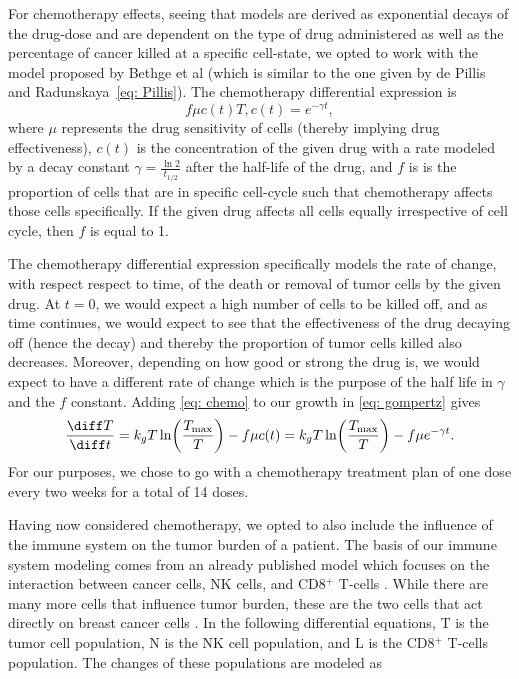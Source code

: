\documentclass[11pt]{amsart}
\begin{document}
For chemotherapy effects, seeing that models are derived as exponential decays of the drug-dose and are dependent on the type of drug administered as well as the percentage of cancer killed at a specific cell-state, we opted to work with the model proposed by Bethge et al (which is similar to the one given by de Pillis and Radunskaya\ \eqref{eq: Pillis}). The chemotherapy differential expression is
\begin{equation}
	f \mu c(t) T, c(t) = e^{-\gamma t} \label{eq: chemo},
\end{equation}
where $\mu$ represents the drug sensitivity of cells (thereby implying drug effectiveness), $c(t)$ is the concentration of the given drug with a rate modeled by a decay constant $\gamma=\frac{\ln{2}}{t_{1/2}}$ after the half-life of the drug, and $f$ is is the proportion of cells that are in specific cell-cycle such that chemotherapy affects those cells specifically.
If the given drug affects all cells equally irrespective of cell cycle, then $f$ is equal to 1.

The chemotherapy differential expression specifically models the rate of change, with respect respect to time, of the death or removal of tumor cells by the given drug.
At $t=0$, we would expect a high number of cells to be killed off, and as time continues, we would expect to see that the effectiveness of the drug decaying off (hence the decay) and thereby the proportion of tumor cells killed also decreases.
Moreover, depending on how good or strong the drug is, we would expect to have a different rate of change which is the purpose of the half life in $\gamma$ and the $f$ constant.
Adding \eqref{eq: chemo} to our growth in \eqref{eq: gompertz} gives 
\begin{equation}
	\frac{\diff T}{\diff t} = k_g T \ln \biggl(\frac{T_{\max}}{T} \biggr) - f \mu c(t) =k_g T \ln \biggl(\frac{T_{\max}}{T} \biggr) - f \mu e^{-\gamma t} \label{eq: gompertz-chemo}.
\end{equation}
For our purposes, we chose to go with a chemotherapy treatment plan of one dose every two weeks for a total of 14 doses. 

Having now considered chemotherapy, we opted to also include the influence of the immune system on the tumor burden of a patient. The basis of our immune system modeling comes from an already published model which focuses on the interaction between cancer cells, NK cells, and CD8$^+$ T-cells \cite{Immune}. While there are many more cells that influence tumor burden, these are the two cells that act directly on breast cancer cells \cite{Amens21}. In the following differential equations, T is the tumor cell population, N is the NK cell population, and L is the CD8$^+$ T-cells population. The changes of these populations are modeled as
\end{document}
